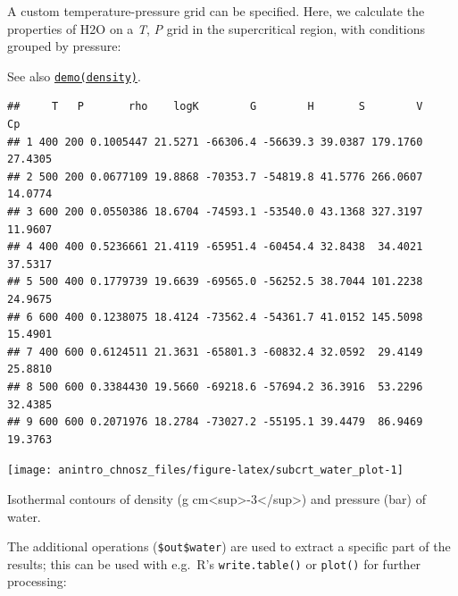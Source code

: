 \documentclass[]{tufte-handout}
\newenvironment{Shaded}{}{}
\newcommand{\KeywordTok}[1]{\textcolor[rgb]{0.00,0.44,0.13}{\textbf{#1}}}
\newcommand{\DataTypeTok}[1]{\textcolor[rgb]{0.56,0.13,0.00}{#1}}
\newcommand{\DecValTok}[1]{\textcolor[rgb]{0.25,0.63,0.44}{#1}}
\newcommand{\StringTok}[1]{\textcolor[rgb]{0.25,0.44,0.63}{#1}}
\newcommand{\OperatorTok}[1]{\textcolor[rgb]{0.40,0.40,0.40}{#1}}
\newcommand{\NormalTok}[1]{#1}
\begin{document}
A custom temperature-pressure grid can be specified. Here, we calculate
the properties of H2O on a \emph{T}, \emph{P} grid in the supercritical
region, with conditions grouped by pressure:

\begin{marginfigure}
See also \href{../demo}{{\texttt{demo(density)}}}.
\end{marginfigure}

\begin{Shaded}
\end{Shaded}

\begin{verbatim}
##     T   P       rho    logK        G        H       S        V      Cp
## 1 400 200 0.1005447 21.5271 -66306.4 -56639.3 39.0387 179.1760 27.4305
## 2 500 200 0.0677109 19.8868 -70353.7 -54819.8 41.5776 266.0607 14.0774
## 3 600 200 0.0550386 18.6704 -74593.1 -53540.0 43.1368 327.3197 11.9607
## 4 400 400 0.5236661 21.4119 -65951.4 -60454.4 32.8438  34.4021 37.5317
## 5 500 400 0.1779739 19.6639 -69565.0 -56252.5 38.7044 101.2238 24.9675
## 6 600 400 0.1238075 18.4124 -73562.4 -54361.7 41.0152 145.5098 15.4901
## 7 400 600 0.6124511 21.3631 -65801.3 -60832.4 32.0592  29.4149 25.8810
## 8 500 600 0.3384430 19.5660 -69218.6 -57694.2 36.3916  53.2296 32.4385
## 9 600 600 0.2071976 18.2784 -73027.2 -55195.1 39.4479  86.9469 19.3763
\end{verbatim}

\begin{marginfigure}
\texttt{[image: anintro\_chnosz\_files/figure-latex/subcrt\_water\_plot-1]} \caption[Isothermal contours of density (g cm<sup>-3</sup>) and pressure (bar) of water]{Isothermal contours of density (g cm<sup>-3</sup>) and pressure (bar) of water.}\label{fig:subcrt_water_plot}
\end{marginfigure}

The additional operations (\texttt{\$out\$water}) are used to extract a
specific part of the results; this can be used with e.g.~R's
\texttt{write.table()} or \texttt{plot()} for further processing:
\end{document}
